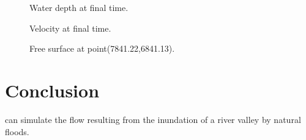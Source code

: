 \begin{figure}
 \centering
  \caption{Water depth at final time.}\label{fig:culm:WaterDepth}
\end{figure}

\begin{figure}
 \centering
  \caption{Velocity at final time.}\label{fig:culm:Velocity}
\end{figure}

\begin{figure}
 \centering
  \caption{Free surface at point(7841.22,6841.13).}\label{fig:culm:timeserie}
\end{figure}

\section{Conclusion}
 can simulate the flow resulting from the inundation of a river valley by natural floods.
